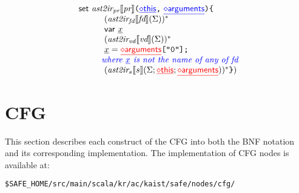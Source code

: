 \[\begin{array}{l@{~}l@{~}l}
{\sf set} \ \atoiPRfd{\prop} \verb+(+{\inblue\newvar{this}}\verb+,+\ {\inblue\newvar{arguments}}\verb+)+
\verb+{+\\
\quad\quad\quad(\atoiFDfd{\fd})^*\\
\quad\quad\quad{\sf var}\ \ir{x}\\
\quad\quad\quad(\atoiVDf{\vd}\env)^*\\
\quad\quad\quad
\ir{x} = {\inred\newvar{arguments}}\verb+["0"];+\\
\quad\quad\note{where \ir{x} is not the name of any of \mbox{fd}}\\
\quad\quad\quad(\atoiSf{\stmt}{\env; {\inred\newvar{this}}; {\inred\newvar{arguments}}})^*
\verb+}+
)
\end{array}
\]

\section{CFG}
This section describes each construct of the \safe CFG
into both the BNF notation and its corresponding implementation.
The implementation of CFG nodes is available at:
\begin{verbatim}
$SAFE_HOME/src/main/scala/kr/ac/kaist/safe/nodes/cfg/
\end{verbatim}

